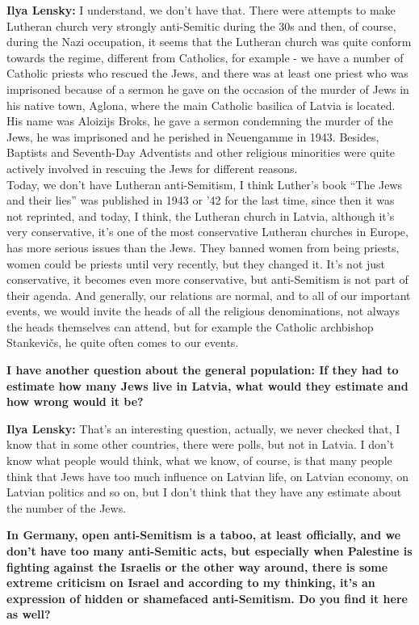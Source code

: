 \textbf{Ilya Lensky:} I understand, we don’t have that. There were attempts to make Lutheran church very strongly anti-Semitic during the 30s and then, of course, during the Nazi occupation, it seems that the Lutheran church was quite conform towards the regime, different from Catholics, for example - we have a number of Catholic priests who rescued the Jews, and there was at least one priest who was imprisoned because of a sermon he gave on the occasion of the murder of Jews in his native town, Aglona, where the main Catholic basilica of Latvia is located. His name was Aloizijs Broks, he gave a sermon condemning the murder of the Jews, he was imprisoned and he perished in Neuengamme in 1943. Besides, Baptists and Seventh-Day Adventists and other religious minorities were quite actively involved in rescuing the Jews for different reasons. \\
Today, we don’t have Lutheran anti-Semitism, I think Luther’s book ``The Jews and their lies'' was published in 1943 or '42 for the last time, since then it was not reprinted, and today, I think, the Lutheran church in Latvia, although it’s very conservative, it’s one of the most conservative Lutheran churches in Europe, has more serious issues than the Jews. They banned women from being priests, women could be priests until very recently, but they changed it. It's not just conservative, it becomes even more conservative, but anti-Semitism is not part of their agenda. And generally, our relations are normal, and to all of our important events, we would invite the heads of all the religious denominations, not always the heads themselves can attend, but for example the Catholic archbishop Stankevičs, he quite often comes to our events. 

\textbf{I have another question about the general population: If they had to estimate how many Jews live in Latvia, what would they estimate and how wrong would it be?}

\textbf{Ilya Lensky:} That’s an interesting question, actually, we never checked that, I know that in some other countries, there were polls, but not in Latvia. I don’t know what people would think, what we know, of course, is that many people think that Jews have too much influence on Latvian life, on Latvian economy, on Latvian politics and so on, but I don’t think that they have any estimate about the number of the Jews. 

\textbf{In Germany, open anti-Semitism is a taboo, at least officially, and we don’t have too many anti-Semitic acts, but especially when Palestine is fighting against the Israelis or the other way around, there is some extreme criticism on Israel and according to my thinking, it’s an expression of hidden or shamefaced anti-Semitism. Do you find it here as well?}

